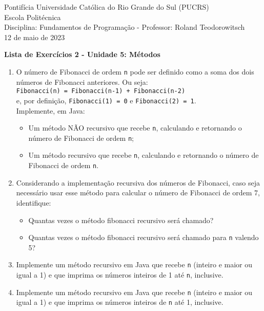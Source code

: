 \documentclass[onecolumn,a4paper,10pt]{report}
\newcommand{\+}{\, + \,}
\newcommand{\<}{\hspace*{-0.4cm}}
\begin{document}
\singlespacing

\begin{center}
Pontifícia Universidade Católica do Rio Grande do Sul (PUCRS)\\
Escola Politécnica\\
Disciplina: Fundamentos de Programação - Professor: Roland Teodorowitsch\\
12 de maio de 2023
\end{center}

\begin{center}
\textbf{Lista de Exercícios 2 - Unidade 5: Métodos}
\end{center}

\begin{enumerate}

	\item O número de Fibonacci de ordem \texttt{n} pode ser definido como a soma dos dois números de Fibonacci anteriores. Ou seja:\\
\texttt{Fibonacci(n) = Fibonacci(n-1) + Fibonacci(n-2)}\\
e, por definição, \texttt{Fibonacci(1) = 0} e \texttt{Fibonacci(2) = 1}.\\
Implemente, em Java:
\begin{itemize}
\item Um método NÃO recursivo que recebe \texttt{n}, calculando e retornando o número de Fibonacci de ordem \texttt{n};
\item Um método recursivo que recebe \texttt{n}, calculando e retornando o número de Fibonacci de ordem \texttt{n}.
\end{itemize}

	\item Considerando a implementação recursiva dos números de Fibonacci,  caso seja necessário usar esse método para calcular o número de Fibonacci de ordem 7, identifique:
\begin{itemize}
\item Quantas vezes o método fibonacci recursivo será chamado?
\item Quantas vezes o método fibonacci recursivo será chamado para \texttt{n} valendo 5?
\end{itemize}

	\item Implemente um método recursivo em Java que recebe \texttt{n} (inteiro e maior ou igual a 1) e que imprima os números inteiros de 1 até \texttt{n}, inclusive.

	\item Implemente um método recursivo em Java que recebe \texttt{n} (inteiro e maior ou igual a 1) e que imprima os números inteiros de \texttt{n} até 1, inclusive.


\end{enumerate}
\end{document}

